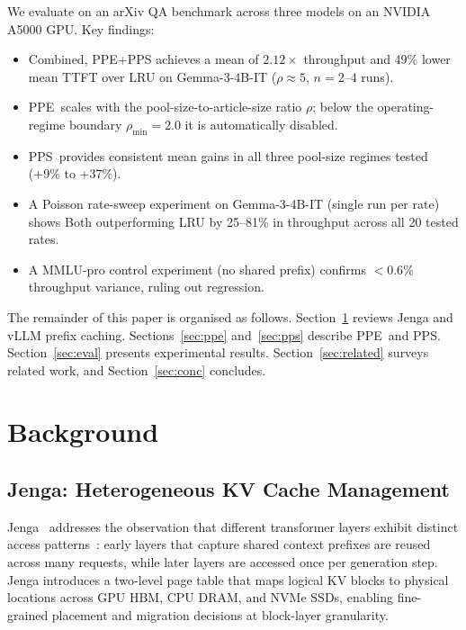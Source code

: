 \documentclass[journal]{IEEEtran}
\newcommand{\ppe}{\textsc{PPE}}
\newcommand{\pps}{\textsc{PPS}}
\newcommand{\rhomin}{\rho_{\min}}
\begin{document}
We evaluate on an arXiv QA benchmark across three models on an NVIDIA A5000
GPU. Key findings:
\begin{itemize}
\item Combined, \ppe{}+\pps{} achieves a mean of $2.12\times$ throughput and
      49\% lower mean TTFT over LRU on Gemma-3-4B-IT ($\rho\approx5$,
      $n=2$--$4$ runs).
\item \ppe\ scales with the pool-size-to-article-size ratio $\rho$; below
      the operating-regime boundary $\rhomin=2.0$ it is automatically
      disabled.
\item \pps\ provides consistent mean gains in all three pool-size regimes
      tested (+9\% to +37\%).
\item A Poisson rate-sweep experiment on Gemma-3-4B-IT (single run per rate)
      shows Both outperforming LRU by 25--81\% in throughput across all 20
      tested rates.
\item A MMLU-pro control experiment (no shared prefix) confirms $<0.6\%$
      throughput variance, ruling out regression.
\end{itemize}

The remainder of this paper is organised as follows. Section~\ref{sec:bg}
reviews Jenga and vLLM prefix caching. Sections~\ref{sec:ppe}
and~\ref{sec:pps} describe \ppe\ and \pps. Section~\ref{sec:eval} presents
experimental results. Section~\ref{sec:related} surveys related work, and
Section~\ref{sec:conc} concludes.

\section{Background}
\label{sec:bg}

\subsection{Jenga: Heterogeneous KV Cache Management}

Jenga~\cite{jenga2025} addresses the observation that different transformer
layers exhibit distinct access patterns~\cite{jenga2025}: early layers that
capture shared context prefixes are reused across many requests, while later
layers are accessed once per generation step. Jenga introduces a two-level
page table
that maps logical KV blocks to physical locations across GPU HBM, CPU DRAM,
and NVMe SSDs, enabling fine-grained placement and migration decisions at
block-layer granularity.
\end{document}
